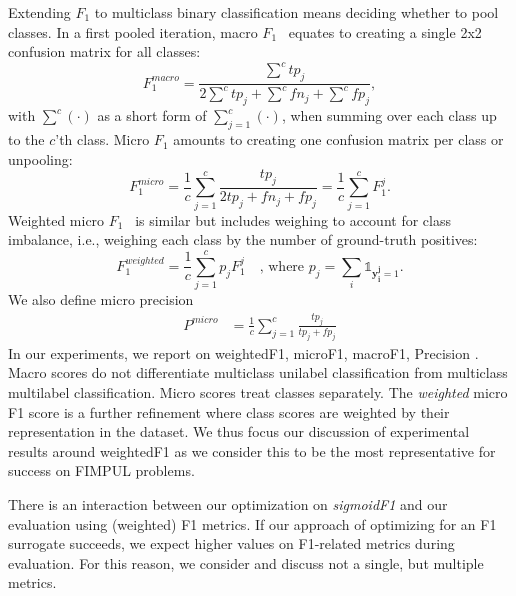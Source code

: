 Extending \(F_1\) to multiclass binary classification means deciding whether to pool classes.
In a first pooled iteration, macro \(F_1\)~\cite{multilabelMetrics} equates to creating a single 2x2 confusion matrix for all classes:
%
\begin{equation}
F_1^{macro} = \frac{\sum^c tp_j}{2 \sum^c tp_j + \sum^c fn_j + \sum^c fp_j},
\end{equation}
%
with $\sum^c (\cdot)$ as a short form of $\sum_{j=1}^c(\cdot)$, when summing over each class up to the $c$'th class.
Micro \(F_1\) \cite{threshForF1, multilabelMetrics} amounts to creating one confusion matrix per class or unpooling:
%
\begin{equation}
F_1^{micro} =  \frac{1}{c} \sum_{j=1}^c \frac{tp_j}{2 tp_j + fn_j + fp_j} =  \frac{1}{c} \sum_{j=1}^c F_1^j.
\end{equation}
%
Weighted micro \(F_1\)~\cite{weightedMetrics} is similar but includes weighing to account for class imbalance, i.e., weighing each class by the number of ground-truth positives:
%
\begin{equation}
F_1^{weighted} = \frac{1}{c} \sum_{j=1}^c p_j F_1^j \quad \text{, where } p_j = \sum_i \mathds{1}_{\mathbf{y_i^j} = 1}.
\end{equation}
%
We also define micro precision%
%
\begin{equation}
\begin{aligned} P^{micro} &=  \frac{1}{c} \sum_{j=1}^c \frac{tp_j}{tp_j+fp_j}%
\end{aligned}
\end{equation}
%
In our experiments, we report on weightedF1, microF1, macroF1, Precision%
. Macro scores do not differentiate multiclass unilabel classification from multiclass multilabel classification. Micro scores treat classes separately. The \emph{weighted} micro F1 score is a further refinement where class scores are weighted by their representation in the dataset. We thus focus our discussion of experimental results around weightedF1 as we consider this to be the most representative for success on FIMPUL problems.

There is an interaction between our optimization on \emph{sigmoidF1} and our evaluation using (weighted) F1 metrics. If our approach of optimizing for an F1 surrogate succeeds, we expect higher values on F1-related metrics during evaluation. For this reason, we consider and discuss not a single, but multiple metrics.

